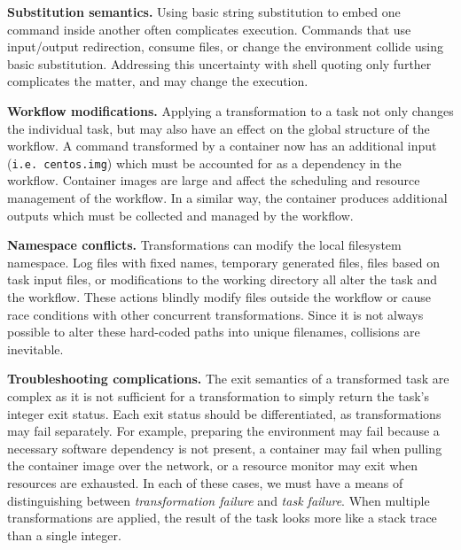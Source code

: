\documentclass[conference]{IEEEtran}
\begin{document}
    {\bf Substitution semantics.} 
    Using basic string substitution to embed one command 
    inside another often complicates execution.  
    Commands that use 
    input/output redirection,
    consume files,
    or change the environment 
    collide using basic substitution.
    Addressing this uncertainty with shell quoting only 
    further complicates the matter, and may
    change the execution.

        
    {\bf Workflow modifications.}
    Applying a transformation to a task not 
    only changes the individual task, 
    but may also have an effect on the 
    global structure of the workflow.  
    A command transformed by a container 
    now has an additional input ({\tt i.e. centos.img})
    which must be accounted for as a 
    dependency in the workflow.
    Container images are large and affect the 
    scheduling and resource management of the workflow.  
    In a similar way, the container produces additional 
    outputs which must be collected and managed by the
    workflow.
    
    {\bf Namespace conflicts.}
    Transformations can modify 
    the local filesystem namespace.
    Log files with fixed names, 
    temporary generated files, 
    files based on task input files, 
    or modifications to the working directory 
    all alter the task and the workflow.
    These actions blindly modify files 
    outside the workflow or cause 
    race conditions with other concurrent transformations.
    Since it is not always possible to alter these
    hard-coded paths into unique filenames,
    collisions are inevitable.
    
    {\bf Troubleshooting complications.}
    The exit semantics of a transformed task are complex 
    as it is not sufficient for a transformation to simply
    return the task's integer exit status.
    Each exit status should be differentiated,
    as transformations may fail separately.
    For example, preparing the environment may fail because a
    necessary software dependency is not present,
    a container may fail when pulling the container image over the network, or 
    a resource monitor may exit when resources are exhausted.
    In each of these cases, we must have a means of distinguishing
    between \emph{transformation failure} and \emph{task failure}.
    When multiple transformations are applied, the result of the
    task looks more like a stack trace than a single integer.
\end{document}
